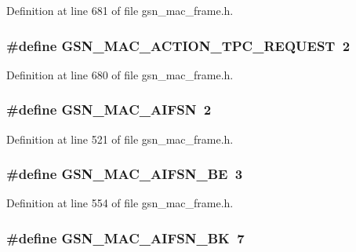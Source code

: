 Definition at line 681 of file gsn\_\-mac\_\-frame.h.

\hypertarget{a00523_a65638a02a0e85ed1156d5ea86fe2e902}{
\subsubsection[{GSN\_\-MAC\_\-ACTION\_\-TPC\_\-REQUEST}]{\setlength{\rightskip}{0pt plus 5cm}\#define GSN\_\-MAC\_\-ACTION\_\-TPC\_\-REQUEST~2}}
\label{a00523_a65638a02a0e85ed1156d5ea86fe2e902}


Definition at line 680 of file gsn\_\-mac\_\-frame.h.

\hypertarget{a00523_a07e8002fde89ed9897cf2813166f78ff}{
\subsubsection[{GSN\_\-MAC\_\-AIFSN}]{\setlength{\rightskip}{0pt plus 5cm}\#define GSN\_\-MAC\_\-AIFSN~2}}
\label{a00523_a07e8002fde89ed9897cf2813166f78ff}


Definition at line 521 of file gsn\_\-mac\_\-frame.h.

\hypertarget{a00523_a55ebb939376aaa5dd72c47f714b9c61d}{
\subsubsection[{GSN\_\-MAC\_\-AIFSN\_\-BE}]{\setlength{\rightskip}{0pt plus 5cm}\#define GSN\_\-MAC\_\-AIFSN\_\-BE~3}}
\label{a00523_a55ebb939376aaa5dd72c47f714b9c61d}


Definition at line 554 of file gsn\_\-mac\_\-frame.h.

\hypertarget{a00523_a6a8ecd7a182ca0cf660b444399f3d9f0}{
\subsubsection[{GSN\_\-MAC\_\-AIFSN\_\-BK}]{\setlength{\rightskip}{0pt plus 5cm}\#define GSN\_\-MAC\_\-AIFSN\_\-BK~7}}
\label{a00523_a6a8ecd7a182ca0cf660b444399f3d9f0}


